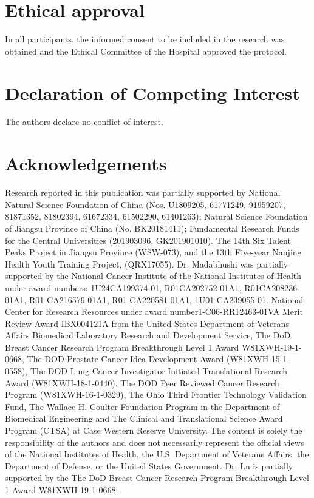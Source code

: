 \documentclass[num-refs]{wiley-article}
\begin{document}
\section*{Ethical approval}
In all participants, the informed consent to be included in the research was obtained and the Ethical Committee of the Hospital approved the protocol.

\section*{Declaration of Competing Interest}
The authors declare no conflict of interest.

\section*{Acknowledgements}
Research reported in this publication was partially supported by National Natural Science Foundation of China (Nos. U1809205, 61771249, 91959207, 81871352, 81802394, 61672334, 61502290, 61401263); Natural Science Foundation of Jiangsu Province of China (No. BK20181411); Fundamental Research Funds for the Central Universities (201903096, GK201901010). The 14th Six Talent Peaks Project in Jiangsu Province (WSW-073), and the 13th Five-year Nanjing Health Youth Training Project, (QRX17055). Dr. Madabhushi was partially supported by the National Cancer Institute of the National Institutes of Health under award numbers: 1U24CA199374-01, R01CA202752-01A1, R01CA208236-01A1, R01 CA216579-01A1, R01 CA220581-01A1, 1U01 CA239055-01. National Center for Research Resources under award number1-C06-RR12463-01VA Merit Review Award IBX004121A from the United States Department of Veterans Affairs Biomedical Laboratory Research and Development Service, The DoD Breast Cancer Research Program Breakthrough Level 1 Award W81XWH-19-1-0668, The DOD Prostate Cancer Idea Development Award (W81XWH-15-1-0558), The DOD Lung Cancer Investigator-Initiated Translational Research Award (W81XWH-18-1-0440), The DOD Peer Reviewed Cancer Research Program (W81XWH-16-1-0329), The Ohio Third Frontier Technology Validation Fund, The Wallace H. Coulter Foundation Program in the Department of Biomedical Engineering and The Clinical and Translational Science Award Program (CTSA) at Case Western Reserve University. The content is solely the responsibility of the authors and does not necessarily represent the official views of the National Institutes of Health, the U.S. Department of Veterans Affairs, the Department of Defense, or the United States Government. Dr. Lu is partially supported by the The DoD Breast Cancer Research Program Breakthrough Level 1 Award W81XWH-19-1-0668.
\end{document}

